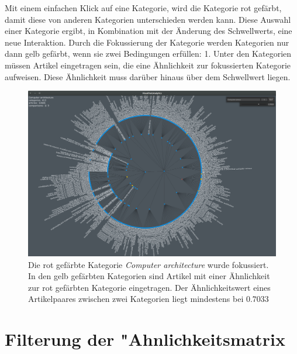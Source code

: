 Mit einem einfachen Klick auf eine Kategorie, wird die Kategorie rot gefärbt, damit diese von anderen Kategorien unterschieden werden kann.
Diese Auswahl einer Kategorie ergibt, in Kombination mit der Änderung des Schwellwerts, eine neue Interaktion.
Durch die Fokussierung der Kategorie werden Kategorien nur dann gelb gefärbt, wenn sie zwei Bedingungen erfüllen:
1. Unter den Kategorien müssen Artikel eingetragen sein, die eine Ähnlichkeit zur fokussierten Kategorie aufweisen. Diese Ähnlichkeit muss darüber hinaus über dem Schwellwert liegen.

\begin{figure}
    \centering
    \includegraphics[width=\textwidth]{images/threshold-7033-lvl3-focus}
    \caption{Die rot gefärbte Kategorie \emph{Computer architecture} wurde fokussiert. In den gelb gefärbten Kategorien sind Artikel mit einer Ähnlichkeit zur rot gefärbten Kategorie eingetragen. Der Ähnlichkeitswert eines Artikelpaares zwischen zwei Kategorien liegt mindestens bei $0.7033$}
    \label{fig:threshold-focus-cat}
\end{figure}


\section{Filterung der "Ahnlichkeitsmatrix} \label{subchap: filter-vis}

